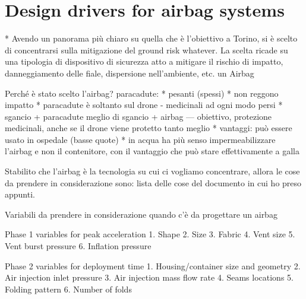 \section{Design drivers for airbag systems}

* Avendo un panorama più chiaro su quella che è l'obiettivo a Torino, si è scelto di concentrarsi sulla mitigazione del ground risk whatever. La scelta ricade su una tipologia di dispositivo di sicurezza atto a mitigare il rischio di impatto, danneggiamento delle fiale, dispersione nell'ambiente, etc. un Airbag


Perché è stato scelto l'airbag?
paracadute:
* pesanti (spessi)
* non reggono impatto
* paracadute è soltanto sul drone - medicinali ad ogni modo persi
* sgancio + paracadute meglio di sgancio + airbag --- obiettivo, protezione medicinali, anche se il drone viene protetto tanto meglio
* vantaggi: può essere usato in ospedale (basse quote)
* in acqua ha più senso impermeabilizzare l'airbag e non il contenitore, con il vantaggio che può stare effettivamente a galla



Stabilito che l'airbag è la tecnologia su cui ci vogliamo concentrare, allora le cose da prendere in considerazione sono:
lista delle cose del documento in cui ho preso appunti. 


Variabili da prendere in considerazione quando c'è da progettare un airbag

Phase 1 variables for peak acceleration
1.	Shape
2.	Size
3.	Fabric
4.	Vent size
5.	Vent burst pressure
6.	Inflation pressure

Phase 2 variables for deployment time
1.	Housing/container size and geometry
2.	Air injection inlet pressure
3.	Air injection mass flow rate
4.	Seams locations
5.	Folding pattern
6.	Number of folds

